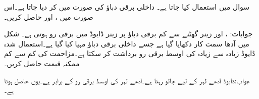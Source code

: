 سوال  میں  استعمال کیا جاتا ہے۔ داخلی برقی دباؤ  کی صورت میں  کر دیا جاتا ہے۔اس صورت میں ،  اور  حاصل کریں۔


جوابات: ،  اور زینر گھٹنے سے کم برقی دباؤ پر زینر ڈایوڈ میں برقی رو  ہوتی ہے۔ 
شکل  میں آدھا سمت کار دکھایا گیا ہے جسے  داخلی برقی دباؤ مہیا کیا گیا ہے۔استعمال شدہ ڈایوڈ زیادہ سے زیادہ  کی اوسط برقی رو برداشت کر سکتا ہے۔مزاحمت کی کم سے کم ممکنہ قیمت حاصل کریں۔

جواب:ڈایوڈ آدھے لہر کے لیے چالو رہتا ہے۔آدھے لہر کی اوسط برقی رو  کے برابر ہے۔یوں  حاصل ہوتا ہے۔ 



